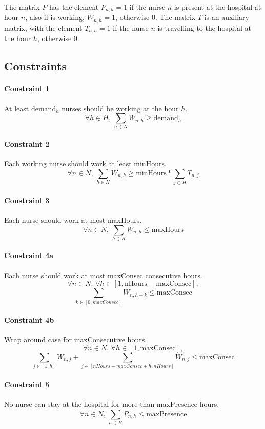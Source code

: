 \documentclass[12pt,a4paper]{article}
\begin{document}
\noindent
The matrix $P$ has the element $P_{n,h} = 1$ if the nurse $n$ is present at the hospital
at hour $n$, also if is working, $W_{n,h} = 1$, otherwise 0.
%
The matrix $T$ is an auxiliary matrix, with the element $T_{n,h} = 1$ if the
nurse $n$ is travelling to the hospital at the hour $h$, otherwise 0.

\subsection{Constraints}

\paragraph{Constraint 1} At least $\textrm{demand}_h$ nurses should be working
at the hour $h$.
$$ \forall h\in H,\, \sum_{n \in N} W_{n,h} \ge \textrm{demand}_h$$
%
\paragraph{Constraint 2} Each working nurse should work at least minHours.
$$ \forall n \in N,\, \sum_{h \in H} W_{n,h} \ge
  \textrm{minHours} * \sum_{j \in H} T_{n,j} $$
%
\paragraph{Constraint 3} Each nurse should work at most maxHours.
$$ \forall n \in N,\, \sum_{h \in H} W_{n,h} \le \textrm{maxHours} $$
%
\paragraph{Constraint 4a} Each nurse should work at most maxConsec consecutive
hours.
$$ \forall n \in N,\, \forall h \in [1, \textrm{nHours} - \textrm{maxConsec}],$$
$$\sum_{k \in [0, maxConsec]} W_{n, h+k} \le \textrm{maxConsec}
$$
%
\paragraph{Constraint 4b} Wrap around case for maxConsecutive hours.
$$ \forall n \in N,\, \forall h \in [1, \textrm{maxConsec}],$$
$$\sum_{j \in [1, h]} W_{n, j} +
  \sum_{j \in [nHours-maxConsec+h, nHours]} W_{n, j}  \le \textrm{maxConsec}
$$
%
\paragraph{Constraint 5} No nurse can stay at the hospital for more than
maxPresence hours.
$$ \forall n \in N, \, \sum_{h \in H} P_{n,h} \le \textrm{maxPresence} $$
%
\end{document}
